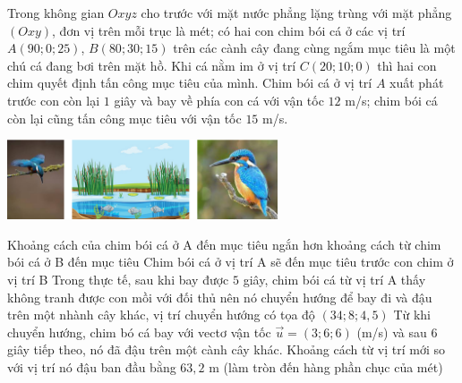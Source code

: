 \begin{ex}%
Trong không gian $Oxyz$ cho trước với mặt nước phẳng lặng trùng với mặt phẳng $(Oxy)$, đơn vị trên mỗi trục là mét; có hai con chim bói cá ở các vị trí$ A\left(90;0;25\right)$, $ B\left(80;30;15\right)$ trên các cành cây đang cùng ngắm mục tiêu là một chú cá đang bơi trên mặt hồ. Khi cá nằm im ở vị trí $ C\left(20;10;0\right)$ thì hai con chim quyết định tấn công mục tiêu của mình. Chim bói cá ở vị trí $A$ xuất phát trước con còn lại $1$ giây và bay về phía con cá với vận tốc $12$ m/s; chim bói cá còn lại cũng tấn công mục tiêu với vận tốc $15$ m/s.\\
\centerline{\includegraphics[width=8cm]{img/HXN-10-15}}
    \choiceTF
    {\True Khoảng cách của chim bói cá ở A đến mục tiêu ngắn hơn khoảng cách từ chim bói cá ở B đến mục tiêu}
    {\True Chim bói cá ở vị trí A sẽ đến mục tiêu trước con chim ở vị trí B}
    {Trong thực tế, sau khi bay được $5$ giây, chim bói cá từ vị trí A thấy không tranh được con mồi với đối thủ nên nó chuyển hướng để bay đi và đậu trên một nhành cây khác, vị trí chuyển hướng có tọa độ $\left(34;8;4,5\right)$}
    {Từ khi chuyển hướng, chim bó cá bay với vectơ vận tốc $\vec{u}=\left(3;6;6\right)$ (m/s) và sau 6 giây tiếp theo, nó đã đậu trên một cành cây khác. Khoảng cách từ vị trí mới so với vị trí nó đậu ban đầu bằng $63{,}2$ m (làm tròn đến hàng phần chục của mét)}
\end{ex}

